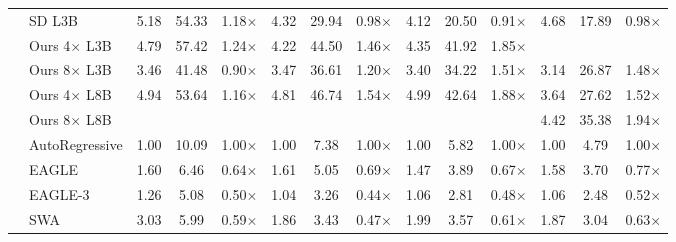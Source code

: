 \begin{table}[t!]
{\begin{tabular}{@{}l|l|ccc|ccc|ccc|ccc@{}}
        & SD L3B                & 5.18 & 54.33 & 1.18$\times$ & 4.32 & 29.94 & 0.98$\times$ & 4.12 & 20.50 & 0.91$\times$ & 4.68 & 17.89 & 0.98$\times$ \\
        \rowcolor[gray]{0.9}\cellcolor{white}
        & Ours 4$\times$ L3B    & 4.79 & 57.42 & 1.24$\times$ & 4.22 & 44.50 & 1.46$\times$ & 4.35 & 41.92 & 1.85$\times$ & \cellcolor{bestspeed}{4.72} & \cellcolor{bestspeed}{37.91} & \cellcolor{bestspeed}{2.08$\times$} \\
        \rowcolor[gray]{0.9}\cellcolor{white} 
        & Ours 8$\times$ L3B    & 3.46 & 41.48 & 0.90$\times$ & 3.47 & 36.61 & 1.20$\times$ & 3.40 & 34.22 & 1.51$\times$ & 3.14 & 26.87 & 1.48$\times$ \\
        \rowcolor[gray]{0.9}\cellcolor{white}
        & Ours 4$\times$ L8B    & 4.94 & 53.64 & 1.16$\times$ & 4.81 & 46.74 & 1.54$\times$ & 4.99 & 42.64 & 1.88$\times$ & 3.64 & 27.62 & 1.52$\times$ \\
        \rowcolor[gray]{0.9}\cellcolor{white} 
        \multirow{-10}{*}{\rotatebox{90}{L3.1-8B}}
        & Ours 8$\times$ L8B    & \cellcolor{bestspeed}{5.51} & \cellcolor{bestspeed}{59.83} & \cellcolor{bestspeed}{1.30$\times$} & \cellcolor{bestspeed}{5.34} & \cellcolor{bestspeed}{51.85} & \cellcolor{bestspeed}{1.71$\times$} & \cellcolor{bestspeed}{5.35} & \cellcolor{bestspeed}{46.59} & \cellcolor{bestspeed}{2.06$\times$} & 4.42 & 35.38 & 1.94$\times$ \\
        \midrule
        \rowcolor[gray]{0.9}\cellcolor{white}
        & AutoRegressive        & 1.00 & 10.09 & 1.00$\times$ & 1.00 & 7.38 & 1.00$\times$ & 1.00 & 5.82 & 1.00$\times$ & 1.00 & 4.79 & 1.00$\times$ \\
        & EAGLE                 & 1.60 & 6.46  & 0.64$\times$ & 1.61 & 5.05 & 0.69$\times$ & 1.47 & 3.89 & 0.67$\times$ & 1.58 & 3.70 & 0.77$\times$ \\
        & EAGLE-3               & 1.26 & 5.08  & 0.50$\times$ & 1.04 & 3.26 & 0.44$\times$ & 1.06 & 2.81 & 0.48$\times$ & 1.06 & 2.48 & 0.52$\times$ \\
        & SWA                   & 3.03 & 5.99  & 0.59$\times$ & 1.86 & 3.43 & 0.47$\times$ & 1.99 & 3.57 & 0.61$\times$ & 1.87 & 3.04 & 0.63$\times$ \\

\end{tabular}}
\end{table}
